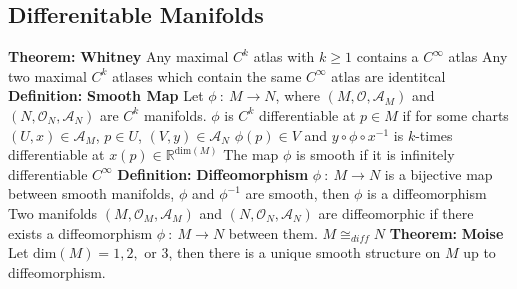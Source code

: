 \documentclass[14pt]{extarticle}
\def\Definition{{\color{blue} \textbf{Definition:} }}
\def\Theorem{{\color{red} \textbf{Theorem:} }}
\begin{document}
\begin{outline}
	\section*{Differenitable Manifolds}
		\1	\Theorem \textbf{Whitney}
			\2	Any maximal $C^k$ atlas with $k \ge 1$ contains a $C^{\infty}$
					atlas
			\2	Any two maximal $C^k$ atlases which contain the same $C^{\infty}$
					atlas are identitcal
		\1	\Definition \textbf{Smooth Map}
			\2	Let $\phi~:~M \rightarrow N$, where $(M,\mathcal{O},\mathscr{A}_M)$
					and $(N,\mathcal{O}_N,\mathscr{A}_N)$ are $C^k$ manifolds.
					$\phi$ is $C^k$ differentiable at $p \in M$ if for some charts
					$(U,x) \in \mathscr{A}_M$, $p \in U$, $(V,y) \in \mathscr{A}_N$
					$\phi(p) \in V$ and $y \circ \phi \circ x^{-1}$ is $k$-times differentiable
					at $x(p) \in \mathbb{R}^{\text{dim}(M)}$
			\2	The map $\phi$ is smooth if it is infinitely differentiable $C^{\infty}$
		\1	\Definition \textbf{Diffeomorphism}
			\2	$\phi~:~M \rightarrow N$ is a bijective map between smooth manifolds,
					$\phi$ and $\phi^{-1}$ are smooth, then $\phi$ is a diffeomorphism
			\2	Two manifolds $(M,\mathcal{O}_M,\mathscr{A}_M)$ and 
					$(N,\mathcal{O}_N,\mathscr{A}_N)$ are diffeomorphic if there exists
					a diffeomorphism $\phi~:~M \rightarrow N$ between them.
			\2	$M \cong_{diff} N$
		\1	\Theorem \textbf{Moise}
			\2	Let $\text{dim}(M) = 1,2,\text{ or } 3$, then there is a unique
					smooth structure on $M$ up to diffeomorphism.
	\end{outline}
\end{document}
